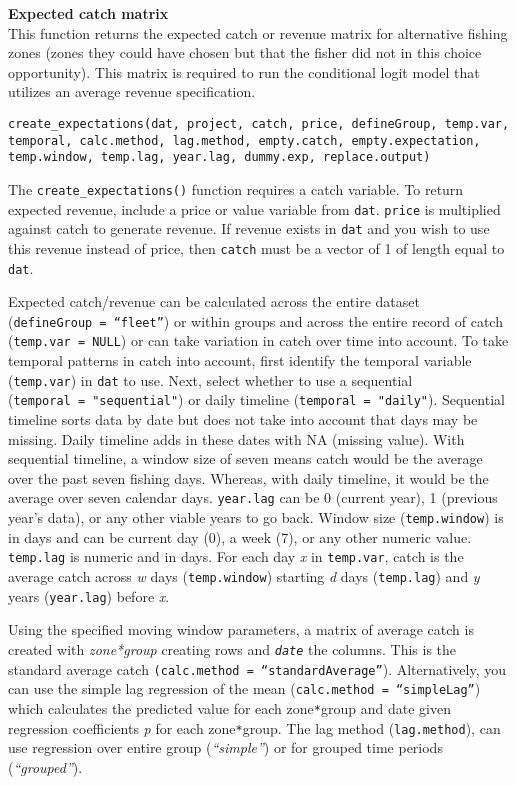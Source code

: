 \documentclass[
]{article}
\begin{document}
\textbf{Expected catch matrix}\\
This function returns the expected catch or revenue matrix for alternative fishing zones (zones they could have chosen but that the fisher did not in this choice opportunity). This matrix is required to run the conditional logit model that utilizes an average revenue specification.

\begin{verbatim}
create_expectations(dat, project, catch, price, defineGroup, temp.var, temporal, calc.method, lag.method, empty.catch, empty.expectation, temp.window, temp.lag, year.lag, dummy.exp, replace.output)
\end{verbatim}

The \texttt{create\_expectations()} function requires a catch variable. To return expected revenue, include a price or value variable from \texttt{dat}. \texttt{price} is multiplied against catch to generate revenue. If revenue exists in \texttt{dat} and you wish to use this revenue instead of price, then \texttt{catch} must be a vector of 1 of length equal to \texttt{dat}.

Expected catch/revenue can be calculated across the entire dataset (\texttt{defineGroup\ =\ “fleet”}) or within groups and across the entire record of catch (\texttt{temp.var\ =\ NULL}) or can take variation in catch over time into account. To take temporal patterns in catch into account, first identify the temporal variable (\texttt{temp.var}) in \texttt{dat} to use. Next, select whether to use a sequential (\texttt{temporal\ =\ "sequential"}) or daily timeline (\texttt{temporal\ =\ "daily"}). Sequential timeline sorts data by date but does not take into account that days may be missing. Daily timeline adds in these dates with NA (missing value). With sequential timeline, a window size of seven means catch would be the average over the past seven fishing days. Whereas, with daily timeline, it would be the average over seven calendar days. \texttt{year.lag} can be 0 (current year), 1 (previous year's data), or any other viable years to go back. Window size (\texttt{temp.window}) is in days and can be current day (0), a week (7), or any other numeric value. \texttt{temp.lag} is numeric and in days. For each day \emph{x} in \texttt{temp.var}, catch is the average catch across \emph{w} days (\texttt{temp.window}) starting \emph{d} days (\texttt{temp.lag}) and \emph{y} years (\texttt{year.lag}) before \emph{x}.

Using the specified moving window parameters, a matrix of average catch is created with \emph{zone*group} creating rows and \emph{\texttt{date}} the columns. This is the standard average catch \texttt{(calc.method\ =\ “standardAverage”}). Alternatively, you can use the simple lag regression of the mean (\texttt{calc.method\ =\ “simpleLag”}) which calculates the predicted value for each zone\texttt{*}group and date given regression coefficients \emph{p} for each zone\texttt{*}group. The lag method (\texttt{lag.method}), can use regression over entire group (\emph{``simple''}) or for grouped time periods (\emph{``grouped''}).
\end{document}

